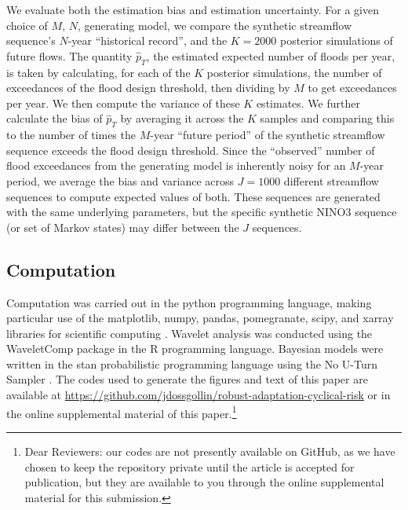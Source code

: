 \documentclass[
  draft,
  linenumbers
]{agujournal2018}
\begin{document}
We evaluate both the estimation bias and estimation uncertainty.
For a given choice of $M$, $N$, generating model, we compare the synthetic streamflow sequence's $N$-year ``historical record'', and the $K=2000$ posterior simulations of future flows.
The quantity $\hat{p}_T$, the estimated expected number of floods per year, is taken by calculating, for each of the $K$ posterior simulations, the number of exceedances of the flood design threshold, then dividing by $M$ to get exceedances per year.
We then compute the variance of these $K$ estimates.
We further calculate the bias of $\hat{p}_T$ by averaging it across the $K$ samples and comparing this to the number of times the $M$-year ``future period'' of the synthetic streamflow sequence exceeds the flood design threshold.
Since the ``observed'' number of flood exceedances from the generating model is inherently noisy for an $M$-year period, we average the bias and variance across $J=1000$ different streamflow sequences to compute expected values of both.
These sequences are generated with the same underlying parameters, but the specific synthetic NINO3 sequence (or set of Markov states) may differ between the $J$ sequences.

\subsection{Computation}\label{sec:methods-computation}

Computation was carried out in the python programming language, making particular use of the matplotlib, numpy, pandas, pomegranate, scipy, and xarray libraries for scientific computing \citep{Hunter:2007ih, vanderWalt:2011dp, McKinney:2010un, schreiber:2017, Jones:2001uv, Hoyer:2017hs}.
Wavelet analysis was conducted using the WaveletComp package \citep{Roesch:wlBQQoIs} in the R programming language.
Bayesian models were written in the stan probabilistic programming language \citep{Carpenter:2017ke} using the No U-Turn Sampler \citep{Hoffman:2011wm,Betancourt:2017vd}.
The codes used to generate the figures and text of this paper are available at \url{https://github.com/jdossgollin/robust-adaptation-cyclical-risk} or in the online supplemental material of this paper.\footnote{Dear Reviewers: our codes are not presently available on GitHub, as we have chosen to keep the repository private until the article is accepted for publication, but they are available to you through the online supplemental material for this submission.}

\end{document}
